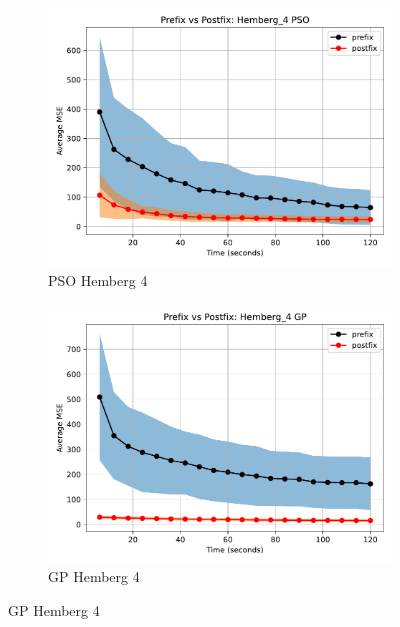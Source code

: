 \documentclass[runningheads]{llncs}
\begin{document}
\begin{figure}
    \vspace{0.5cm}
    
    \begin{subfigure}[b]{0.4\textwidth}
        \includegraphics[width=\linewidth, keepaspectratio]{Hemberg_Benchmarks/PrePostHemberg_4PSO.pdf}
        \caption{PSO Hemberg 4}
        \label{subfig:hemberg_4_PSO}
    \end{subfigure}
    \begin{subfigure}[b]{0.4\textwidth}
        \includegraphics[width=\linewidth, keepaspectratio]{Hemberg_Benchmarks/PrePostHemberg_4GP.pdf}
        \caption{GP Hemberg 4}
        \label{subfig:hemberg_4_GP}
    \end{subfigure}
    

\end{figure}
\end{document}

